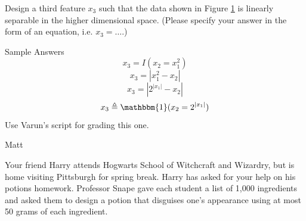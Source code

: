 \begin{questions}
\question[2] Design a third feature $x_3$ such that the data shown in Figure \ref{fig:feateng} is linearly separable in the higher dimensional space. (Please specify your answer in the form of an equation, i.e. $x_3 = \ldots$.)

    \begin{figure}[H]
    \begin{center}
    \end{center}
    \caption{}
    \label{fig:feateng}
    \end{figure}

    \begin{tcolorbox}[fit,height=2cm, width=15cm, blank, borderline={1pt}{-2pt}]
    \end{tcolorbox}
    \begin{soln}
    Sample Answers 
    $$ x_3 = I (x_2 = x_1^2) $$
    $$x_3 = | x_1^2 - x_2| $$
    $$x_3 = | 2^{|x_1|} - x_2| $$
    $$x_3 \triangleq \mathbbm{1}(x_2 = 2^{|x_1|})$$
    Use Varun's script for grading this one.
    \end{soln}
    \begin{qauthor}
    Matt
    \end{qauthor}
    
\begin{EnvFullwidth}
    Your friend Harry attends Hogwarts School of Witchcraft and Wizardry, but is home visiting Pittsburgh for spring break. Harry has asked for your help on his potions homework. Professor Snape gave each student a list of 1,000 ingredients and asked them to design a potion that disguises one's appearance using at most 50 grams of each ingredient. 
    

\end{EnvFullwidth}
\end{questions}
